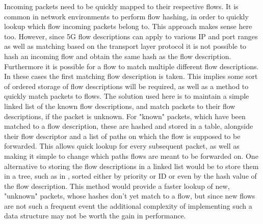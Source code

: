 Incoming packets need to be quickly mapped to their respective flows. It is common in network environments to perform flow hashing, in order to quickly lookup which flow incoming packets belong to. This approach makes sense here too. However, since 5G flow descriptions can apply to various IP and port ranges as well as matching based on the transport layer protocol it is not possible to hash an incoming flow and obtain the same hash as the flow description. Furthermore it is possible for a flow to match multiple different flow descriptions. In these cases the first matching flow description is taken. This implies some sort of ordered storage of flow descriptions will be required, as well as a method to quickly match packets to flows. The solution used here is to maintain a simple linked list of the known flow descriptions, and match packets to their flow descriptions, if the packet is unknown. For "known" packets, which have been matched to a flow description, these are hashed and stored in a table, alongside their flow descriptor and a list of paths on which the flow is supposed to be forwarded. This allows quick lookup for every subsequent packet, as well as making it simple to change which paths flows are meant to be forwarded on. One alternative to storing the flow descriptions in a linked list would be to store them in a tree, such as in \cite{tongaonkar2004fast}, sorted either by priority or ID or even by the hash value of the flow description. This method would provide a faster lookup of new, "unknown" packets, whose hashes don't yet match to a flow, but since new flows are not such a frequent event the additional complexity of implementing such a data structure may not be worth the gain in performance.

